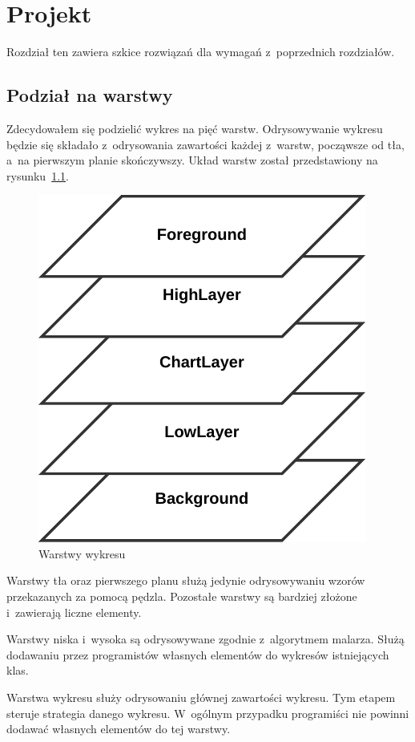 \chapter{Projekt}
Rozdział ten zawiera szkice rozwiązań dla wymagań z~poprzednich rozdziałów.

\section{Podział na warstwy}
Zdecydowałem się podzielić wykres na pięć warstw. Odrysowywanie wykresu będzie się składało z~odrysowania zawartości każdej z~warstw, począwsze od tła, a~na pierwszym planie skończywszy.
Układ warstw został przedstawiony na rysunku~\ref{rys:warstwy}.

\begin{figure}[H]
\centering
\includegraphics{img/warstwy.pdf}
\caption{Warstwy wykresu}\label{rys:warstwy}
\end{figure}

Warstwy tła oraz pierwszego planu służą jedynie odrysowywaniu wzorów przekazanych za pomocą pędzla. Pozostałe warstwy są bardziej złożone i~zawierają liczne elementy.

Warstwy niska i~wysoka są odrysowywane zgodnie z~algorytmem malarza. Służą dodawaniu przez programistów własnych elementów do wykresów istniejących klas.

Warstwa wykresu służy odrysowaniu głównej zawartości wykresu. Tym etapem steruje strategia danego wykresu. W~ogólnym przypadku programiści nie powinni dodawać własnych elementów do tej warstwy.

